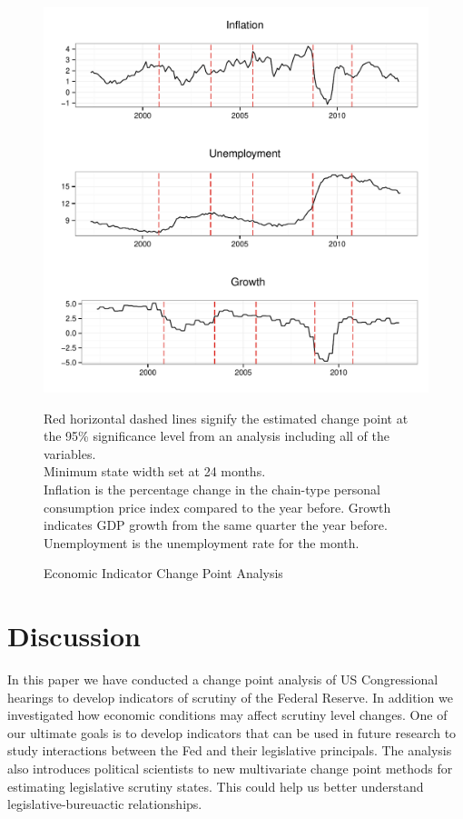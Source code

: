 \documentclass[a4paper]{article}\usepackage[]{graphicx}\usepackage[]{color}
\newenvironment{knitrout}{}{} %
\begin{document}
\begin{figure}
    \caption{Economic Indicator Change Point Analysis}
    \label{fig:FullEconCP}
\begin{knitrout}
\color{fgcolor}

{\centering \includegraphics[width=0.8\linewidth]{figure/EconFullCP} 

}



\end{knitrout}
{\scriptsize{Red horizontal dashed lines signify the estimated change point at the 95\% significance level from an analysis including all of the variables.\\
Minimum state width set at 24 months. \\
Inflation is the percentage change in the chain-type personal consumption price index compared to the year before. Growth indicates GDP growth from the same quarter the year before. Unemployment is the unemployment rate for the month.}}
\end{figure}


\section{Discussion}

In this paper we have conducted a change point analysis of US Congressional hearings to develop indicators of scrutiny of the Federal Reserve. In addition we investigated how economic conditions may affect scrutiny level changes. One of our ultimate goals is to develop indicators that can be used in future research to study interactions between the Fed and their legislative principals. The analysis also introduces political scientists to new multivariate change point methods for estimating legislative scrutiny states. This could help us better understand legislative-bureuactic relationships.
\end{document}
